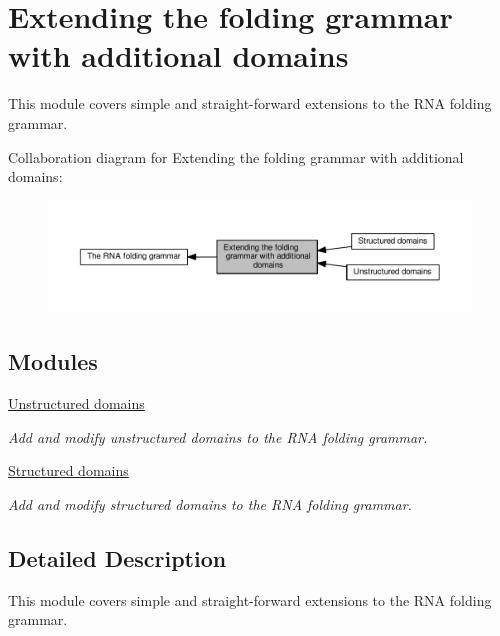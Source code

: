 \hypertarget{group__domains}{}\section{Extending the folding grammar with additional domains}
\label{group__domains}


This module covers simple and straight-\/forward extensions to the R\+NA folding grammar.  


Collaboration diagram for Extending the folding grammar with additional domains\+:
\nopagebreak
\begin{figure}[H]
\begin{center}
\leavevmode
\includegraphics[width=350pt]{group__domains}
\end{center}
\end{figure}
\subsection*{Modules}
\begin{DoxyCompactItemize}
\item 
\hyperlink{group__domains__up}{Unstructured domains}
\begin{DoxyCompactList}\small\item\em Add and modify unstructured domains to the R\+NA folding grammar. \end{DoxyCompactList}\item 
\hyperlink{group__domains__struc}{Structured domains}
\begin{DoxyCompactList}\small\item\em Add and modify structured domains to the R\+NA folding grammar. \end{DoxyCompactList}\end{DoxyCompactItemize}


\subsection{Detailed Description}
This module covers simple and straight-\/forward extensions to the R\+NA folding grammar. 


